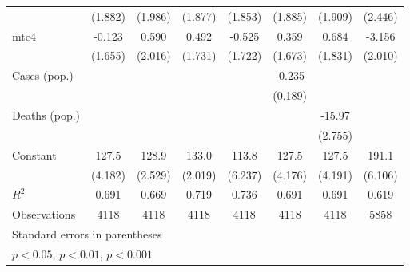 \documentclass{article}
\begin{document}
{\begin{longtable}{l*{7}{c}}
                &  (1.882)         &  (1.986)         &  (1.877)         &  (1.853)         &  (1.885)         &  (1.909)         &  (2.446)         \\
mtc4            &   -0.123         &    0.590         &    0.492         &   -0.525         &    0.359         &    0.684         &   -3.156         \\
                &  (1.655)         &  (2.016)         &  (1.731)         &  (1.722)         &  (1.673)         &  (1.831)         &  (2.010)         \\
Cases (pop.)    &                  &                  &                  &                  &   -0.235         &                  &                  \\
                &                  &                  &                  &                  &  (0.189)         &                  &                  \\
Deaths (pop.)   &                  &                  &                  &                  &                  &   -15.97\sym{***}&                  \\
                &                  &                  &                  &                  &                  &  (2.755)         &                  \\
Constant        &    127.5\sym{***}&    128.9\sym{***}&    133.0\sym{***}&    113.8\sym{***}&    127.5\sym{***}&    127.5\sym{***}&    191.1\sym{***}\\
                &  (4.182)         &  (2.529)         &  (2.019)         &  (6.237)         &  (4.176)         &  (4.191)         &  (6.106)         \\
\hline
\(R^{2}\)       &    0.691         &    0.669         &    0.719         &    0.736         &    0.691         &    0.691         &    0.619         \\
Observations    &     4118         &     4118         &     4118         &     4118         &     4118         &     4118         &     5858         \\
\hline\hline
\multicolumn{8}{l}{\footnotesize Standard errors in parentheses}\\
\multicolumn{8}{l}{\footnotesize \sym{*} \(p<0.05\), \sym{**} \(p<0.01\), \sym{***} \(p<0.001\)}\\
\end{longtable}
}
\end{document}
